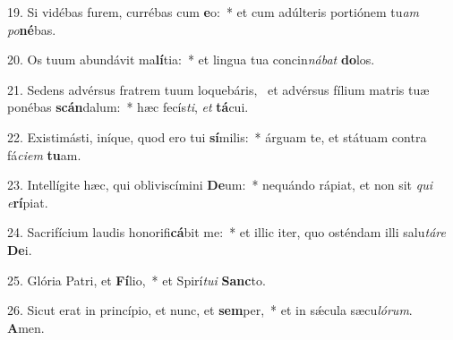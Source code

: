 19. Si vidébas furem, currébas cum \textbf{e}o:~*  et cum adúlteris portiónem tu\textit{am} \textit{po}\textbf{né}bas.\

20. Os tuum abundávit ma\textbf{lí}tia:~*  et lingua tua concin\textit{ná}\textit{bat} \textbf{do}los.\

21. Sedens advérsus fratrem tuum loquebáris, \dag\  et advérsus fílium matris tuæ ponébas \textbf{scán}dalum:~*  hæc fecís\textit{ti}, \textit{et} \textbf{tá}cui.\

22. Existimásti, iníque, quod ero tui \textbf{sí}milis:~*  árguam te, et státuam contra fá\textit{ci}\textit{em} \textbf{tu}am.\

23. Intellígite hæc, qui obliviscímini \textbf{De}um:~*  nequándo rápiat, et non sit \textit{qui} \textit{e}\textbf{rí}piat.\

24. Sacrifícium laudis honorifi\textbf{cá}bit me:~*  et illic iter, quo osténdam illi salu\textit{tá}\textit{re} \textbf{De}i.\

25. Glória Patri, et \textbf{Fí}lio,~*  et Spirí\textit{tu}\textit{i} \textbf{Sanc}to.\

26. Sicut erat in princípio, et nunc, et \textbf{sem}per,~*  et in sǽcula sæcu\textit{ló}\textit{rum}. \textbf{A}men.\

